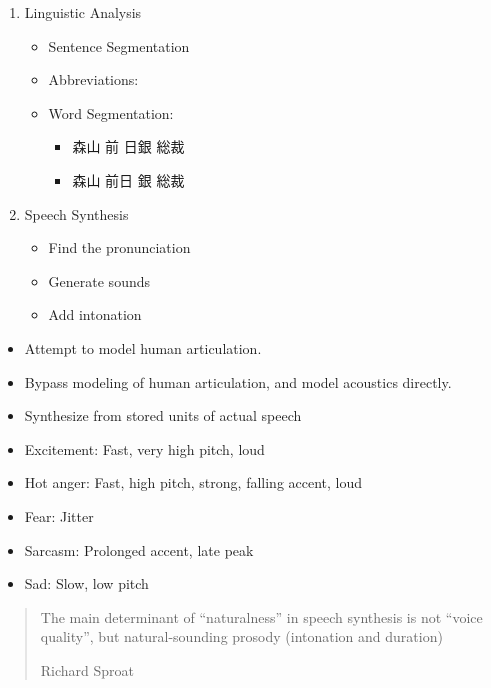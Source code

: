\documentclass[a4paper,landscape,headrule,footrule,xetex]{foils}
\begin{document}

\begin{enumerate}
\item Linguistic Analysis
  \begin{itemize}
  \item Sentence Segmentation
  \item Abbreviations: 
  \item Word Segmentation: 
    \begin{itemize}
    \item 森山 前 日銀 総裁 
    \item[\Bad]  森山 前日 銀 総裁　
      \end{itemize}
    \end{itemize}
\item Speech Synthesis
  \begin{itemize}
  \item Find the pronunciation
  \item Generate sounds
  \item Add intonation
  \end{itemize}
\end{enumerate}

  \begin{itemize}
  \item {} Attempt to model human articulation.
  \item {} Bypass modeling of human articulation, and model acoustics directly.
  \item {} Synthesize from stored units of actual speech
  \end{itemize}
  

\begin{itemize}
\item Excitement: Fast, very high pitch, loud
\item Hot anger: Fast, high pitch, strong, falling accent, loud
\item Fear: Jitter
\item Sarcasm: Prolonged accent, late peak
\item Sad: Slow, low pitch
\end{itemize}

\begin{quote}
  The main determinant of ``naturalness'' in speech synthesis is not
  ``voice quality'', but natural-sounding prosody (intonation and
  duration) 
  \begin{flushright}
    Richard Sproat
  \end{flushright}
\end{quote}
\end{document}

